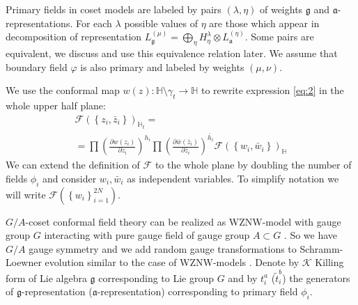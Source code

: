 \documentclass{jetpl}
\newcommand{\gf}{\mathfrak{g}}
\newcommand{\af}{\mathfrak{a}}
\begin{document}
Primary fields in coset models are labeled by pairs $(\lambda,\eta)$ of weights $\gf$ and $\af$-representations. For each $\lambda$ possible values of $\eta$ are those which appear in decomposition of representation $L^{(\mu)}_{\gf}=\bigoplus_{\eta} H^{\lambda}_{\eta}\otimes L^{(\eta)}_{\af}$. Some pairs are equivalent, we discuss and use this equivalence relation later. 
We assume that boundary field $\varphi$ is also primary and labeled by weights $(\mu,\nu)$.

  We use the conformal map  $w(z):\mathbb{H}\setminus\gamma_{t}\to \mathbb{H}$ to rewrite expression \eqref{eq:2} in the whole upper half plane:
\begin{multline}
  \mathcal{F}(\left\{z_{i},\bar z_{i}\right\})_{\mathbb{H}_{t}}=\\
  =\prod \left(\frac{\partial w(z_{i})}{\partial z_{i}}\right)^{h_{i}} 
  \prod \left(\frac{\partial \bar w(\bar z_{i})}{\partial \bar z_{i}}\right)^{\bar h_i}
  \mathcal{F}(\left\{w_{i}, \bar w_{i}\right\})_{\mathbb{H}}
  \label{eq:1}
\end{multline}
We can extend the definition of $\mathcal{F}$ to the whole plane by doubling the number of fields $\phi_{i}$ \cite{cardy2004boundary,cardy1984conformal} and consider $w_{i},\bar w_{i}$ as independent variables. To simplify notation we will write $\mathcal{F}(\left\{w_{i}\right\}_{i=1}^{2N})$.


$G/A$-coset conformal field theory can be realized as WZNW-model with gauge group $G$ interacting with pure gauge field of gauge group $A\subset G$ \cite{gawdzki1988g,figueroa89equivalence}. So we have $G/A$ gauge symmetry and we add random gauge transformations to Schramm-Loewner evolution \cite{2011arXiv1112.4354N} similar to the case of WZNW-models \cite{bettelheim2005stochastic}. Denote by $\mathcal{K}$ Killing form of Lie algebra $\gf$ corresponding to Lie group $G$ and by $t^{a}_{i}$ ($\tilde{t}^{b}_{i}$) the  generators of $\gf$-representation ($\af$-representation) corresponding to primary field $\phi_{i}$.
\end{document}
